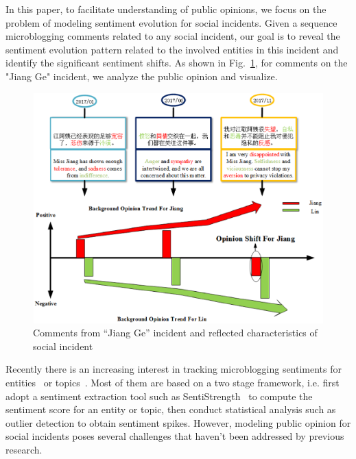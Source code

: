 \documentclass[runningheads]{llncs}
\begin{document}
In this paper, to facilitate understanding of public opinions, we focus on the problem of modeling sentiment evolution for social incidents. 
Given a sequence microblogging comments related to any social incident, our goal is to reveal the sentiment evolution pattern related to the involved entities in this incident and identify the significant sentiment shifts. 
As shown in Fig.~\ref{fig:tweet}, for comments on the "Jiang Ge" incident, we analyze the public opinion and visualize. %


\begin{figure}
    \centering
    \includegraphics[width=1.0\textwidth,height=3.5in]{tweet.eps}
    \setlength{\abovecaptionskip}{-0.1cm}
    \caption{Comments from ``Jiang Ge'' incident and reflected characteristics of social incident}\label{fig:tweet}
\end{figure}

Recently there is an increasing interest in tracking microblogging sentiments for entities~\cite{Giachanou2016sentichange,Giachanou2017sentichange} or topics~\cite{Tsytsarau2014Topics,Thelwall2011topic}. Most of them are based on a two stage framework, i.e. first adopt a sentiment extraction tool such as SentiStrength~\cite{sentistrength2010} to compute the sentiment score for an entity or topic, then conduct statistical analysis such as outlier detection to obtain sentiment spikes. However, modeling public opinion for social incidents poses several challenges that haven't been addressed by previous research.
\end{document}
